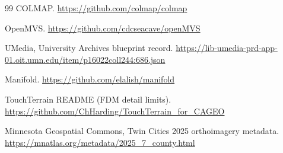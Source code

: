 \documentclass[11pt,letterpaper]{article}
\begin{document}
\begin{thebibliography}{99}
 COLMAP. \url{https://github.com/colmap/colmap}

 OpenMVS. \url{https://github.com/cdcseacave/openMVS}

 UMedia, University Archives blueprint record. \url{https://lib-umedia-prd-app-01.oit.umn.edu/item/p16022coll244:686.json}

 Manifold. \url{https://github.com/elalish/manifold}

 TouchTerrain README (FDM detail limits). \url{https://github.com/ChHarding/TouchTerrain_for_CAGEO}

 Minnesota Geospatial Commons, Twin Cities 2025 orthoimagery metadata. \url{https://mnatlas.org/metadata/2025_7_county.html}

\end{thebibliography}
\end{document}
